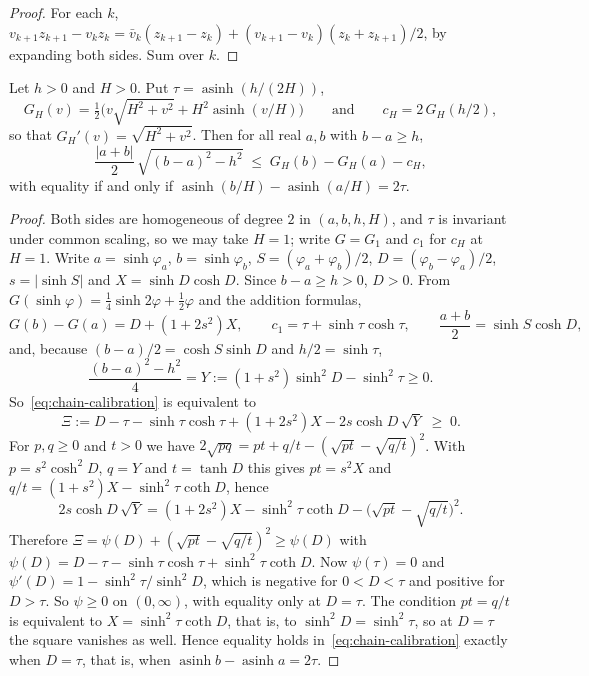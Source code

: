 \begin{proof}
For each $k$, $v_{k+1}z_{k+1} - v_k z_k = \bar v_k (z_{k+1} - z_k) + (v_{k+1} - v_k)(z_k + z_{k+1})/2$, by expanding both sides.
Sum over $k$.
\end{proof}

\begin{lemma}\label{lem:chain-calibration}
Let $h > 0$ and $H > 0$.
Put $\tau = \operatorname{asinh}(h/(2H))$,
\[
G_H(v) = \tfrac12\bigl( v\sqrt{H^2 + v^2} + H^2 \operatorname{asinh}(v/H) \bigr)\qquad\text{and}\qquad c_H = 2\,G_H(h/2),
\]
so that $G_H'(v) = \sqrt{H^2 + v^2}$.
Then for all real $a, b$ with $b - a \ge h$,
\begin{equation}\label{eq:chain-calibration}
\frac{|a+b|}{2}\,\sqrt{(b-a)^2 - h^2} \;\le\; G_H(b) - G_H(a) - c_H,
\end{equation}
with equality if and only if $\operatorname{asinh}(b/H) - \operatorname{asinh}(a/H) = 2\tau$.
\end{lemma}

\begin{proof}
Both sides are homogeneous of degree $2$ in $(a, b, h, H)$, and $\tau$ is invariant under common scaling, so we may take $H = 1$; write $G = G_1$ and $c_1$ for $c_H$ at $H = 1$.
Write $a = \sinh\varphi_a$, $b = \sinh\varphi_b$, $S = (\varphi_a + \varphi_b)/2$, $D = (\varphi_b - \varphi_a)/2$, $s = |\sinh S|$ and $X = \sinh D\cosh D$.
Since $b - a \ge h > 0$, $D > 0$.
From $G(\sinh\varphi) = \tfrac14\sinh 2\varphi + \tfrac12\varphi$ and the addition formulas,
\[
G(b) - G(a) = D + (1 + 2s^2)X,\qquad c_1 = \tau + \sinh\tau\cosh\tau,\qquad \frac{a+b}{2} = \sinh S\cosh D,
\]
and, because $(b-a)/2 = \cosh S\sinh D$ and $h/2 = \sinh\tau$,
\[
\frac{(b-a)^2 - h^2}{4} = Y := (1 + s^2)\sinh^2 D - \sinh^2\tau \ge 0 .
\]
So~\eqref{eq:chain-calibration} is equivalent to
\[
\Xi := D - \tau - \sinh\tau\cosh\tau + (1 + 2s^2)X - 2s\cosh D\,\sqrt{Y} \;\ge\; 0 .
\]
For $p, q \ge 0$ and $t > 0$ we have $2\sqrt{pq} = pt + q/t - (\sqrt{pt} - \sqrt{q/t})^2$.
With $p = s^2\cosh^2 D$, $q = Y$ and $t = \tanh D$ this gives $pt = s^2 X$ and $q/t = (1+s^2)X - \sinh^2\tau\coth D$, hence
\[
2s\cosh D\,\sqrt{Y} = (1 + 2s^2)X - \sinh^2\tau\coth D - \bigl(\sqrt{pt} - \sqrt{q/t}\bigr)^2 .
\]
Therefore $\Xi = \psi(D) + (\sqrt{pt} - \sqrt{q/t})^2 \ge \psi(D)$ with $\psi(D) = D - \tau - \sinh\tau\cosh\tau + \sinh^2\tau\coth D$.
Now $\psi(\tau) = 0$ and $\psi'(D) = 1 - \sinh^2\tau/\sinh^2 D$, which is negative for $0 < D < \tau$ and positive for $D > \tau$.
So $\psi \ge 0$ on $(0,\infty)$, with equality only at $D = \tau$.
The condition $pt = q/t$ is equivalent to $X = \sinh^2\tau\coth D$, that is, to $\sinh^2 D = \sinh^2\tau$, so at $D = \tau$ the square vanishes as well.
Hence equality holds in~\eqref{eq:chain-calibration} exactly when $D = \tau$, that is, when $\operatorname{asinh} b - \operatorname{asinh} a = 2\tau$.
\end{proof}

